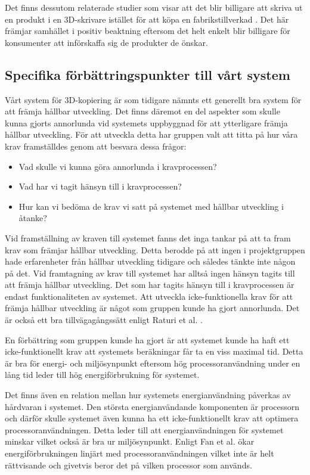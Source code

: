 Det finns dessutom relaterade studier som visar att det blir billigare att skriva ut en produkt i en 3D-skrivare istället för att köpa en fabrikstillverkad \cite{wittbrodt2013life}. Det här främjar samhället i positiv beaktning eftersom det helt enkelt blir billigare för konsumenter att införskaffa sig de produkter de önskar.

\subsection{Specifika förbättringspunkter till vårt system}
Vårt system för 3D-kopiering är som tidigare nämnts ett generellt bra system för att främja hållbar utveckling. Det finns däremot en del aspekter som skulle kunna gjorts annorlunda vid systemets uppbyggnad för att ytterligare främja hållbar utveckling. För att utveckla detta har gruppen valt att titta på hur våra krav framställdes genom att besvara dessa frågor:

\begin{itemize}
	\item Vad skulle vi kunna göra annorlunda i kravprocessen?
	\item Vad har vi tagit hänsyn till i kravprocessen?
	\item Hur kan vi bedöma de krav vi satt på systemet med hållbar utveckling i åtanke?
\end{itemize}

Vid framställning av kraven till systemet fanns det inga tankar på att ta fram krav som främjar hållbar utveckling. Detta berodde på att ingen i projektgruppen hade erfarenheter från hållbar utveckling tidigare och således tänkte inte någon på det. Vid framtagning av krav till systemet har alltså ingen hänsyn tagits till att främja hållbar utveckling. Det som har tagits hänsyn till i kravprocessen är endast funktionaliteten av systemet. Att utveckla icke-funktionella krav för att främja hållbar utveckling är något som gruppen kunde ha gjort annorlunda. Det är också ett bra tillvägagångssätt enligt Raturi et al. \cite{raturi2014developing}.

En förbättring som gruppen kunde ha gjort är att systemet kunde ha haft ett icke-funktionellt krav att systemets beräkningar får ta en viss maximal tid. Detta är bra för energi- och miljösynpunkt eftersom hög processoranvändning under en lång tid leder till hög energiförbrukning för systemet.

Det finns även en relation mellan hur systemets energianvändning påverkas av hårdvaran i systemet. Den största energianvändande komponenten är processorn och därför skulle systemet även kunna ha ett icke-funktionellt krav att optimera processoranvändningen. Detta leder till att energianvändningen för systemet minskar vilket också är bra ur miljösynpunkt. Enligt Fan et al. \cite{fan2007power} ökar energiförbrukningen linjärt med processoranvändningen vilket inte är helt rättvisande och givetvis beror det på vilken processor som används.

